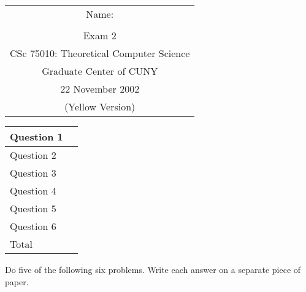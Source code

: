 \documentclass[11pt]{article}
\begin{document}
{\bf
\begin{tabular}{c}
	Name: \underline{\hspace{2.5in}}\\ \\
	{\large Exam 2}\\
        	CSc 75010: Theoretical Computer Science\\
        	Graduate Center of CUNY\\
	22 November 2002\\
        	(Yellow Version)
\end{tabular}
}
\hfill
\begin{tabular}{|l|c|}
\hline
Question 1 & \mbox{\hspace{.5in}}\\
\hline        	
Question 2 & \\
\hline
Question 3 & \\
\hline
        	Question 4 & \\
\hline
        	Question 5 & \\
\hline
        	Question 6 & \\
\hline\hline
         Total & \\
\hline
\end{tabular}

Do five of the following six problems.  Write each answer on a separate
piece of paper.
\end{document}
